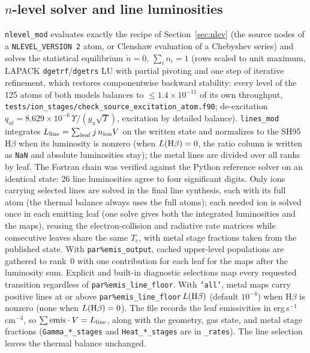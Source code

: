 \documentclass[english,a4paper]{my_memo}
\newcommand{\code}[1]{\texttt{#1}}
\begin{document}
\subsection{$n$-level solver and line luminosities}
\label{sec:nlevel}
\code{nlevel\_mod} evaluates exactly the recipe of
Section~\ref{sec:nlev} (the source nodes of a \code{NLEVEL\_VERSION 2}
atom, or Clenshaw evaluation of a Chebyshev series)
and solves the statistical equilibrium
$\dot n = 0$, $\sum_i n_i = 1$ (rows scaled to unit maximum, LAPACK
\code{dgetrf}/\code{dgetrs} LU with partial pivoting and one step of
iterative refinement, which restores componentwise backward stability:
every level of the 125 atoms of both models balances to $\le
1.4{\times}10^{-11}$ of its own throughput,
\code{tests/ion\_stages/check\_source\_excitation\_atom.f90};
de-excitation $q_{ul} = 8.629{\times}10^{-6}\,\Upsilon/(g_u\sqrt T)$,
excitation by detailed balance).  \code{lines\_mod} integrates
$L_{\rm line} = \sum_{\rm leaf} j\,n_{\rm ion}V$ on the written state
and normalizes to the SH95 H$\beta$ when its luminosity is nonzero
(when $L({\rm H}\beta)=0$, the ratio column is written as \code{NaN} and
absolute luminosities stay); the metal lines are divided over
all ranks by leaf.  The Fortran chain was verified
against the Python reference solver on an identical state: 26 line
luminosities agree to four significant digits.
Only ions carrying selected lines are solved in the final line
synthesis, each with its full atom (the thermal balance always uses the
full atoms); each needed ion is solved once in each emitting leaf (one
solve gives both the integrated luminosities and the maps), reusing the
electron-collision and radiative rate matrices while consecutive leaves
share the same $T_e$, with metal stage fractions taken from the
published state.  With \code{par\%emis\_output}, cached upper-level
populations are gathered to rank~0 with one contribution for each leaf
for the maps after the luminosity sum. Explicit and built-in
diagnostic selections map every requested transition regardless of
\code{par\%emis\_line\_floor}. With \code{'all'},
metal maps carry positive lines at or above
\code{par\%emis\_line\_floor}$\,L({\rm H}\beta)$ (default $10^{-4}$)
when H$\beta$ is nonzero (none when $L({\rm H}\beta)=0$). The file records
the leaf emissivities in erg\,s$^{-1}$\,cm$^{-3}$, so
$\sum {\rm emis}\cdot V = L_{\rm line}$, along with the geometry, gas
state, and metal stage fractions (\code{Gamma\_*\_stages} and
\code{Heat\_*\_stages} are in \code{\_rates}). The line selection leaves
the thermal balance unchanged.
\end{document}
